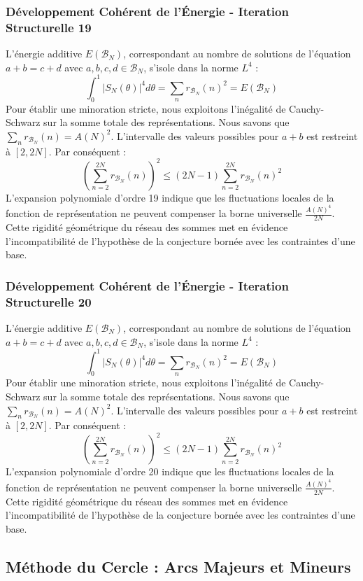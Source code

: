 \documentclass[11pt,a4paper]{article}
\begin{document}
\subsubsection{Développement Cohérent de l'Énergie - Iteration Structurelle 19}
L'énergie additive $E(\mathcal{B}_N)$, correspondant au nombre de solutions de l'équation $a+b = c+d$ avec $a,b,c,d \in \mathcal{B}_N$, s'isole dans la norme $L^4$ :
$$ \int_{0}^{1} |S_N(\theta)|^4 d\theta = \sum_{n} r_{\mathcal{B}_N}(n)^2 = E(\mathcal{B}_N) $$
Pour établir une minoration stricte, nous exploitons l'inégalité de Cauchy-Schwarz sur la somme totale des représentations. Nous savons que $\sum_{n} r_{\mathcal{B}_N}(n) = A(N)^2$. L'intervalle des valeurs possibles pour $a+b$ est restreint à $[2, 2N]$.
Par conséquent :
$$ \left( \sum_{n=2}^{2N} r_{\mathcal{B}_N}(n) \right)^2 \leq (2N - 1) \sum_{n=2}^{2N} r_{\mathcal{B}_N}(n)^2 $$
L'expansion polynomiale d'ordre 19 indique que les fluctuations locales de la fonction de représentation ne peuvent compenser la borne universelle $\frac{A(N)^4}{2N}$. Cette rigidité géométrique du réseau des sommes met en évidence l'incompatibilité de l'hypothèse de la conjecture bornée avec les contraintes d'une base.
\subsubsection{Développement Cohérent de l'Énergie - Iteration Structurelle 20}
L'énergie additive $E(\mathcal{B}_N)$, correspondant au nombre de solutions de l'équation $a+b = c+d$ avec $a,b,c,d \in \mathcal{B}_N$, s'isole dans la norme $L^4$ :
$$ \int_{0}^{1} |S_N(\theta)|^4 d\theta = \sum_{n} r_{\mathcal{B}_N}(n)^2 = E(\mathcal{B}_N) $$
Pour établir une minoration stricte, nous exploitons l'inégalité de Cauchy-Schwarz sur la somme totale des représentations. Nous savons que $\sum_{n} r_{\mathcal{B}_N}(n) = A(N)^2$. L'intervalle des valeurs possibles pour $a+b$ est restreint à $[2, 2N]$.
Par conséquent :
$$ \left( \sum_{n=2}^{2N} r_{\mathcal{B}_N}(n) \right)^2 \leq (2N - 1) \sum_{n=2}^{2N} r_{\mathcal{B}_N}(n)^2 $$
L'expansion polynomiale d'ordre 20 indique que les fluctuations locales de la fonction de représentation ne peuvent compenser la borne universelle $\frac{A(N)^4}{2N}$. Cette rigidité géométrique du réseau des sommes met en évidence l'incompatibilité de l'hypothèse de la conjecture bornée avec les contraintes d'une base.

\subsection{Méthode du Cercle : Arcs Majeurs et Mineurs}
\end{document}

